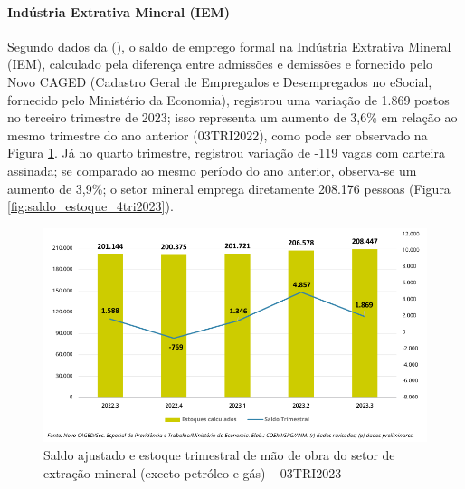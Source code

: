 \paragraph{Indústria Extrativa Mineral (IEM)}

Segundo dados da \citeauthor{anm2023informe3} (\citeyear{anm2023informe3}), o saldo de emprego formal na Indústria Extrativa Mineral (IEM), calculado pela diferença entre admissões e demissões e fornecido pelo Novo CAGED (Cadastro Geral de Empregados e Desempregados no eSocial, fornecido pelo Ministério da Economia), registrou uma variação de 1.869 postos no terceiro trimestre de 2023; isso representa um aumento de 3,6\% em relação ao mesmo trimestre do ano anterior (03TRI2022), como pode ser observado na Figura \ref{fig:saldo_estoque_3tri2023}. Já no quarto trimestre, registrou variação de -119 vagas com carteira assinada; se comparado ao mesmo período do ano anterior, observa-se um aumento de 3,9\%; o setor mineral emprega diretamente 208.176 pessoas (Figura \ref{fig:saldo_estoque_4tri2023}).

\begin{figure}[!htb]
    \centering
    \includegraphics[width=\textwidth]{figures/image4_saldo_estoque_3tri2023.png}
    \caption{Saldo ajustado e estoque trimestral de mão de obra do setor de extração mineral (exceto petróleo e gás) -- 03TRI2023}
    \label{fig:saldo_estoque_3tri2023}
\end{figure}

